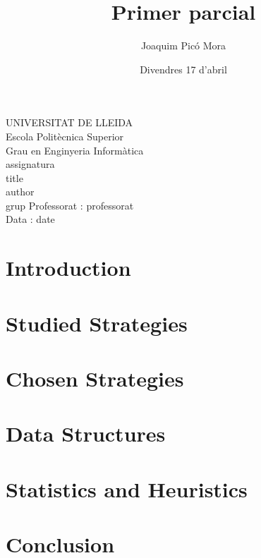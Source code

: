 \documentclass{article}
\title{Primer parcial}
\author{Joaquim Picó Mora}
\date{Divendres 17 d'abril}
\renewcommand{\maketitle}{ %
	\begin{titlepage}
		\raggedright{UNIVERSITAT DE LLEIDA \\
			Escola Politècnica Superior \\
			Grau en Enginyeria Informàtica\\
			\1assignatura\\}
		\vspace{5cm}
		\centering\huge{\5title \\}
		\vspace{3cm}
		\large{\6author} \\
		\normalsize{\3grup}
		\vfill
		Professorat : \4professorat \\
		Data : \7date
\end{titlepage}}
\begin{document}
	\maketitle
	\thispagestyle{empty}
	
	\newpage
	\tableofcontents
	\newpage
	\section{Introduction}
	
	\section{Studied Strategies}
	
	\section{Chosen Strategies}
	
	\section{Data Structures}
	
	\section{Statistics and Heuristics}
	
	\section{Conclusion}
	
\end{document}
